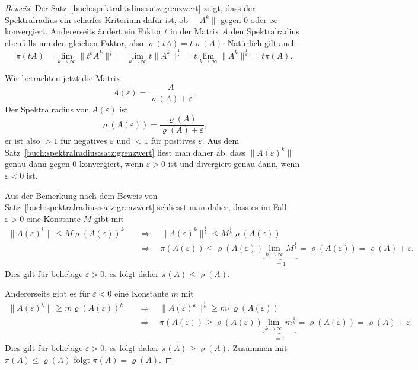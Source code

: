 \begin{proof}[Beweis]
Der Satz~\ref{buch:spektralradius:satz:grenzwert} zeigt, dass der
Spektralradius ein scharfes Kriterium dafür ist, ob $\|A^k\|$ 
gegen 0 oder $\infty$ konvergiert.
Andererseits ändert ein Faktor $t$ in der Matrix $A$ den Spektralradius
ebenfalls um den gleichen Faktor, also $\varrho(tA)=t\varrho(A)$.
Natürlich gilt auch
\[
\pi(tA)
=
\lim_{k\to\infty} \|t^kA^k\|^\frac1k
=
\lim_{k\to\infty} t\|A^k\|^\frac1k
=
t\lim_{k\to\infty} \|A^k\|^\frac1k
=
t\pi(A).
\]

Wir betrachten jetzt die Matrix
\[
A(\varepsilon) = \frac{A}{\varrho(A) + \varepsilon}.
\]
Der Spektralradius von $A(\varepsilon)$ ist
\[
\varrho(A(\varepsilon)) = \frac{\varrho(A)}{\varrho(A)+\varepsilon},
\]
er ist also $>1$ für negatives $\varepsilon$ und $<1$ für positives
$\varepsilon$.
Aus dem Satz~\ref{buch:spektralradius:satz:grenzwert} liest man daher ab,
dass $\|A(\varepsilon)^k\|$ genau dann gegen $0$ konvergiert, wenn
$\varepsilon > 0$ ist und divergiert genau dann, wenn $\varepsilon< 0$ ist.

Aus der Bemerkung nach dem Beweis von
Satz~\ref{buch:spektralradius:satz:grenzwert} schliesst man daher, dass 
es im Fall $\varepsilon > 0$ eine Konstante $M$ gibt mit
\begin{align*}
\|A(\varepsilon) ^k\|\le M\varrho(A(\varepsilon))^k
\quad&\Rightarrow\quad
\|A(\varepsilon) ^k\|^\frac1k\le M^\frac1k\varrho(A(\varepsilon))
\\
&\Rightarrow\quad
\pi(A(\varepsilon)) \le  \varrho(A(\varepsilon))
\underbrace{\lim_{k\to\infty} M^\frac1k}_{\displaystyle=1}
=
\varrho(A(\varepsilon))
=
\varrho(A)+\varepsilon.
\end{align*}
Dies gilt für beliebige $\varepsilon >0$, es folgt daher
$\pi(A) \le \varrho(A)$.

Andererseits gibt es für $\varepsilon <0$ eine Konstante $m$ mit
\begin{align*}
\|A(\varepsilon) ^k\|\ge m\varrho(A(\varepsilon))^k
\quad&\Rightarrow\quad
\|A(\varepsilon) ^k\|^\frac1k\ge m^\frac1k\varrho(A(\varepsilon))
\\
&\Rightarrow\quad
\pi(A(\varepsilon)) \ge  \varrho(A(\varepsilon))
\underbrace{\lim_{k\to\infty} m^\frac1k}_{\displaystyle=1}
=
\varrho(A(\varepsilon))
=
\varrho(A)+\varepsilon.
\end{align*}
Dies gilt für beliebige $\varepsilon> 0$, es folgt daher
$\pi(A) \ge \varrho(A)$.
Zusammen mit $\pi(A) \le \varrho(A)$ folgt $\pi(A)=\varrho(A)$.
\end{proof}


